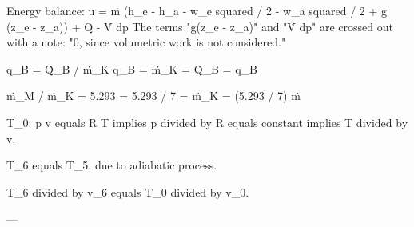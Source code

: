 Energy balance:  
u = ṁ (h_e - h_a - w_e squared / 2 - w_a squared / 2 + g (z_e - z_a)) + Q̇ - V̇ dp  
The terms "g(z_e - z_a)" and "V̇ dp" are crossed out with a note: "0, since volumetric work is not considered."  

q_B = Q̇_B / ṁ_K  
q_B = ṁ_K = Q̇_B = q_B  

ṁ_M / ṁ_K = 5.293 = 5.293 / 7 = ṁ_K = (5.293 / 7) ṁ

T_0: p v equals R T implies p divided by R equals constant implies T divided by v.  

T_6 equals T_5, due to adiabatic process.  

T_6 divided by v_6 equals T_0 divided by v_0.  

---